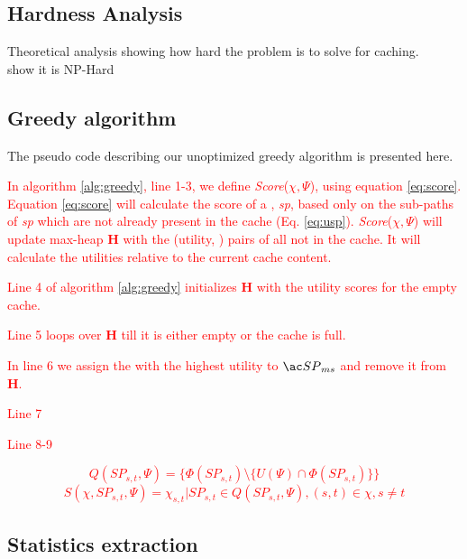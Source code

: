 \subsection{Hardness Analysis}
Theoretical analysis showing how hard the problem is to solve for \spath caching.\\
show it is NP-Hard
 

\subsection{Greedy algorithm}
The pseudo code describing our unoptimized greedy algorithm is presented here.

\textcolor{red}{
In algorithm \ref{alg:greedy}, line 1-3, we define \textit{Score}($\chi, \Psi$), using equation \ref{eq:score}. Equation \ref{eq:score} will calculate the score of a \spathns, \textit{sp}, based only on the sub-paths of \textit{sp} which are not already present in the cache (Eq. \ref{eq:usp}). \textit{Score}($\chi, \Psi$) will update max-heap \textbf{H} with the (utility, \spath) pairs of all \spath not in the cache. It will calculate the utilities relative to the current cache content. 
}

\textcolor{red}{
Line 4 of algorithm \ref{alg:greedy} initializes \textbf{H} with the utility scores for the empty cache.
}

\textcolor{red}{
Line 5 loops over \textbf{H} till it is either empty or the cache is full. 
}

\textcolor{red}{
In line 6 we assign the \spath with the highest utility to $\spath_{ms}$ and remove it from \textbf{H}.
}

\textcolor{red}{
Line 7 
}

\textcolor{red}{
Line 8-9 
}


\textcolor{red}{
\begin{equation} \label{eq:usp}
Q(SP_{s,t}, \Psi) = \{ \Phi(SP_{s,t}) \setminus \{ U(\Psi) \cap \Phi(SP_{s,t}) \} \}
\end{equation}
}
\textcolor{red}{
\begin{equation} \label{eq:score}
S(\chi, SP_{s,t}, \Psi) =  \chi_{s,t} | SP_{s,t} \in Q(SP_{s,t}, \Psi), (s,t) \in \chi, s \neq t
\end{equation}
}




\subsection{Statistics extraction}

